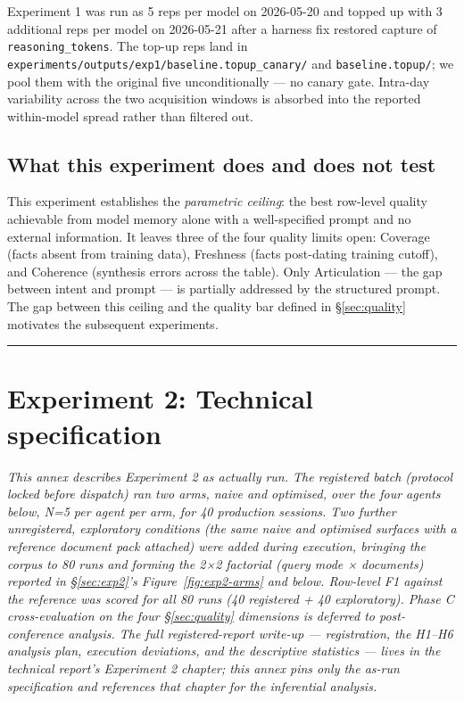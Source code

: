 \documentclass[a4paper,11pt]{article}
\begin{document}
Experiment 1 was run as 5 reps per model on 2026-05-20 and topped up
with 3 additional reps per model on 2026-05-21 after a harness fix
restored capture of \texttt{reasoning\_tokens}. The top-up reps land in
\texttt{experiments/outputs/exp1/baseline.topup\_canary/} and
\texttt{baseline.topup/}; we pool them with the original five
unconditionally --- no canary gate. Intra-day variability across the two
acquisition windows is absorbed into the reported within-model spread
rather than filtered out.

\subsection*{What this experiment does and does not
test}

This experiment establishes the \emph{parametric ceiling}: the best
row-level quality achievable from model memory alone with a
well-specified prompt and no external information. It leaves three of
the four quality limits open: Coverage (facts absent from training
data), Freshness (facts post-dating training cutoff), and Coherence
(synthesis errors across the table). Only Articulation --- the gap
between intent and prompt --- is partially addressed by the structured
prompt. The gap between this ceiling and the quality bar defined in
§\ref{sec:quality} motivates the subsequent experiments.

\begin{center}\rule{0.5\linewidth}{0.5pt}\end{center}

\section{Experiment 2: Technical specification}\label{sec:annex-exp2}

\emph{This annex describes Experiment 2 as actually run. The registered
batch (protocol locked before dispatch) ran two arms, naive and
optimised, over the four agents below, N=5 per agent per arm, for 40
production sessions. Two further unregistered, exploratory conditions
(the same naive and optimised surfaces with a reference document pack
attached) were added during execution, bringing the corpus to 80 runs
and forming the 2×2 factorial (query mode × documents) reported in
§\ref{sec:exp2}'s Figure~\ref{fig:exp2-arms} and below. Row-level F1
against the reference was scored for all 80 runs (40 registered + 40
exploratory). Phase C cross-evaluation on the four §\ref{sec:quality}
dimensions is deferred to post-conference analysis. The full
registered-report write-up --- registration, the H1--H6 analysis plan,
execution deviations, and the descriptive statistics --- lives in the
technical report's Experiment 2 chapter; this annex pins only the as-run
specification and references that chapter for the inferential analysis.}
\end{document}
